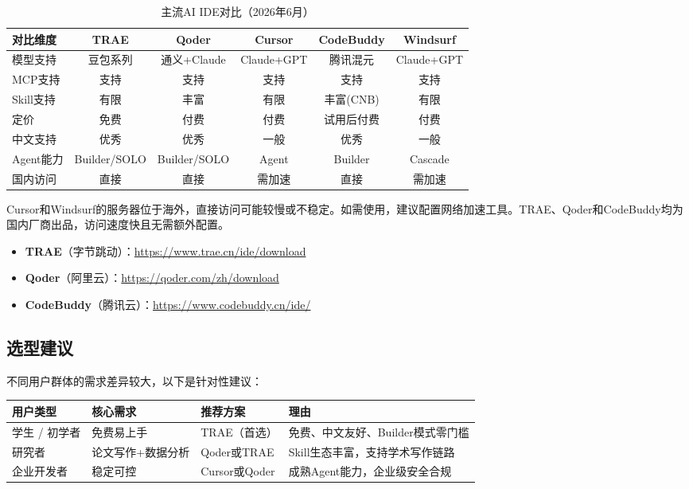 \begin{table}[H]
\centering
\small
\begin{tabular}{lccccc}
\toprule
\textbf{对比维度} & \textbf{TRAE} & \textbf{Qoder} & \textbf{Cursor} & \textbf{CodeBuddy} & \textbf{Windsurf} \\
\midrule
模型支持 & 豆包系列 & 通义+Claude & Claude+GPT & 腾讯混元 & Claude+GPT \\
MCP支持 & 支持 & 支持 & 支持 & 支持 & 支持 \\
Skill支持 & 有限 & 丰富 & 有限 & 丰富(CNB) & 有限 \\
定价 & 免费 & 付费 & 付费 & 试用后付费 & 付费 \\
中文支持 & 优秀 & 优秀 & 一般 & 优秀 & 一般 \\
Agent能力 & Builder/SOLO & Builder/SOLO & Agent & Builder & Cascade \\
国内访问 & 直接 & 直接 & 需加速 & 直接 & 需加速 \\
\bottomrule
\end{tabular}
\caption{主流AI IDE对比（2026年6月）}
\end{table}

\begin{notebox}[关于"国内访问"]
Cursor和Windsurf的服务器位于海外，直接访问可能较慢或不稳定。如需使用，建议配置网络加速工具。TRAE、Qoder和CodeBuddy均为国内厂商出品，访问速度快且无需额外配置。
\end{notebox}


\begin{notebox}
\begin{itemize}[leftmargin=2em]
  \item \textbf{TRAE}（字节跳动）：\href{https://www.trae.cn/ide/download}{https://www.trae.cn/ide/download}
  \item \textbf{Qoder}（阿里云）：\href{https://qoder.com/zh/download}{https://qoder.com/zh/download}
  \item \textbf{CodeBuddy}（腾讯云）：\href{https://www.codebuddy.cn/ide/}{https://www.codebuddy.cn/ide/}
\end{itemize}
\end{notebox}

\subsection{选型建议}

不同用户群体的需求差异较大，以下是针对性建议：

\begin{table}[H]
\centering
\begin{tabular}{lp{3.5cm}p{5cm}l}
\toprule
\textbf{用户类型} & \textbf{核心需求} & \textbf{推荐方案} & \textbf{理由} \\
\midrule
学生 / 初学者 & 免费易上手 & TRAE（首选） & 免费、中文友好、Builder模式零门槛 \\
研究者 & 论文写作+数据分析 & Qoder或TRAE & Skill生态丰富，支持学术写作链路 \\
企业开发者 & 稳定可控 & Cursor或Qoder & 成熟Agent能力，企业级安全合规 \\
\bottomrule
\end{tabular}
\end{table}

